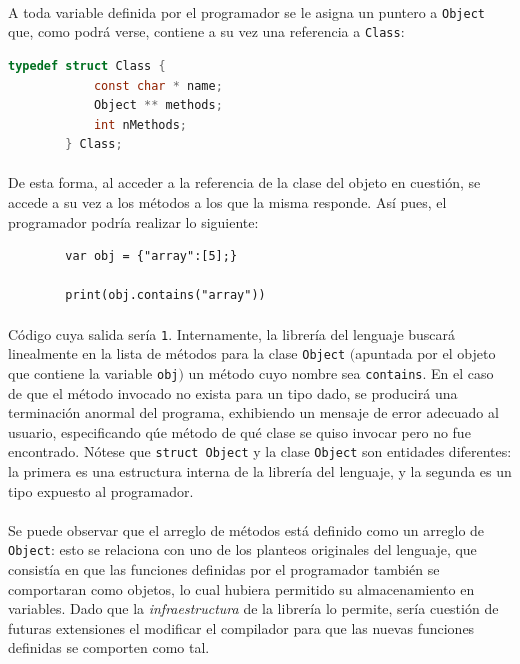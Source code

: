 \documentclass[12pt]{article}
\begin{document}
	\paragraph{} A toda variable definida por el programador se le asigna un puntero a \verb|Object| que, como podrá verse, contiene a su vez una referencia a \verb|Class|:
	
	\begin{center}
		\begin{lstlisting}[language=C]
		typedef struct Class {
			const char * name;
			Object ** methods;
			int nMethods;
		} Class;
		\end{lstlisting}
	\end{center}
	
	\paragraph{} De esta forma, al acceder a la referencia de la clase del objeto en cuestión, se accede a su vez a los métodos a los que la misma responde. Así pues, el programador podría realizar lo siguiente:
	
	\begin{center}
		\begin{lstlisting}
		var obj = {"array":[5];}
		
		print(obj.contains("array"))
		\end{lstlisting}
	\end{center}
	
	\paragraph{} Código cuya salida sería \verb|1|. Internamente, la librería del lenguaje buscará linealmente en la lista de métodos para la clase \verb|Object| $($apuntada por el objeto que contiene la variable \verb|obj|$)$ un método cuyo nombre sea \verb|contains|. En el caso de que el método invocado no exista para un tipo dado, se producirá una terminación anormal del programa, exhibiendo un mensaje de error adecuado al usuario, especificando qúe método de qué clase se quiso invocar pero no fue encontrado. Nótese que \verb|struct Object| y la clase \verb|Object| son entidades diferentes: la primera es una estructura interna de la librería del lenguaje, y la segunda es un tipo expuesto al programador.
	
	
	\paragraph{} Se puede observar que el arreglo de métodos está definido como un arreglo de \verb|Object|: esto se relaciona con uno de los planteos originales del lenguaje, que consistía en que las funciones definidas por el programador también se comportaran como objetos, lo cual hubiera permitido su almacenamiento en variables. Dado que la \textit{infraestructura} de la librería lo permite, sería cuestión de futuras extensiones el modificar el compilador para que las nuevas funciones definidas se comporten como tal.
	
\end{document}
